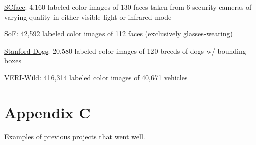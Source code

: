 \documentclass{tufte-handout}
\begin{document}
\item
  \href{http://www.scface.org/}{SCface}: 4,160 labeled color images of
  130 faces taken from 6 security cameras of varying quality in either
  visible light or infrared mode
\item
  \href{https://sites.google.com/view/sof-dataset}{SoF}: 42,592 labeled
  color images of 112 faces (exclusively glasses-wearing)
\item
  \href{http://vision.stanford.edu/aditya86/ImageNetDogs/}{Stanford
  Dogs}: 20,580 labeled color images of 120 breeds of dogs w/ bounding
  boxes
\item
  \href{https://github.com/PKU-IMRE/VERI-Wild}{VERI-Wild}: 416,314
  labeled color images of 40,671 vehicles
\ei

\section*{Appendix C}
Examples of previous projects that went well.
\end{document}
